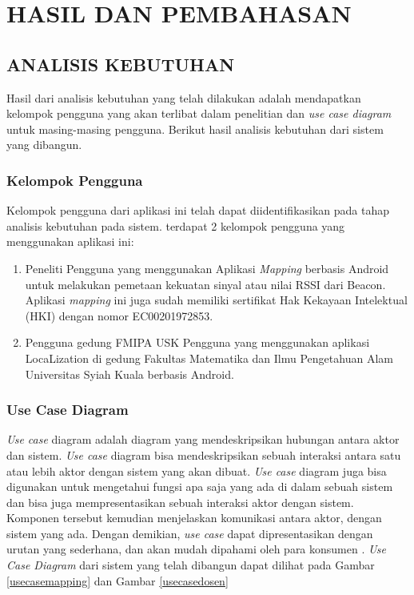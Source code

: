 \fancyhf{}
\fancyfoot[C]{\thepage}
\chapter{HASIL DAN PEMBAHASAN}
\section{ANALISIS KEBUTUHAN}

Hasil dari analisis kebutuhan yang telah dilakukan adalah mendapatkan kelompok pengguna yang akan terlibat dalam penelitian dan \textit{use case diagram} untuk masing-masing pengguna. Berikut hasil analisis kebutuhan dari sistem yang dibangun.
\subsection{Kelompok Pengguna}
Kelompok pengguna dari aplikasi ini telah dapat diidentifikasikan pada tahap analisis kebutuhan pada sistem. terdapat 2 kelompok pengguna yang menggunakan aplikasi ini:
\begin{enumerate}[1.]
	\item Peneliti
	      \newline Pengguna yang menggunakan Aplikasi \textit{Mapping} berbasis Android untuk melakukan pemetaan kekuatan sinyal atau nilai RSSI dari Beacon. Aplikasi \textit{mapping} ini juga sudah memiliki sertifikat Hak Kekayaan Intelektual (HKI) dengan nomor EC00201972853.
	\item Pengguna gedung FMIPA USK
	      \newline Pengguna yang menggunakan aplikasi LocaLization di gedung Fakultas Matematika dan Ilmu Pengetahuan Alam Universitas Syiah Kuala berbasis Android.
\end{enumerate}

\subsection{Use Case Diagram}
\textit{Use case} diagram adalah diagram yang mendeskripsikan hubungan antara aktor dan sistem. \textit{Use case} diagram bisa mendeskripsikan sebuah interaksi antara satu atau lebih aktor dengan sistem yang akan dibuat. \textit{Use case} diagram juga bisa digunakan untuk mengetahui fungsi apa saja yang ada di dalam sebuah sistem dan  bisa juga mempresentasikan sebuah interaksi aktor dengan sistem. Komponen tersebut kemudian menjelaskan komunikasi antara aktor,  dengan sistem yang ada. Dengan demikian, \textit{use case} dapat dipresentasikan dengan urutan yang sederhana, dan akan mudah dipahami oleh para konsumen \citep{Yu2009}. \textit{Use Case Diagram} dari sistem yang telah dibangun dapat dilihat pada Gambar \ref{usecasemapping} dan Gambar \ref{usecasedosen}

